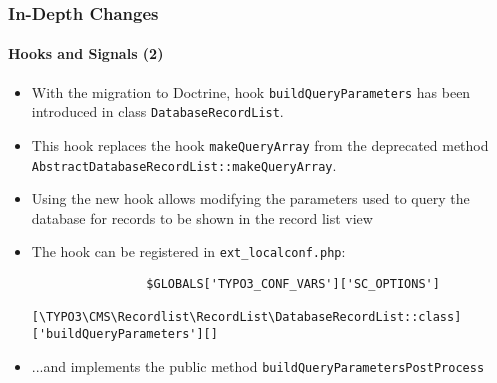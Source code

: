 \begin{frame}[fragile]
	\frametitle{In-Depth Changes}
	\framesubtitle{Hooks and Signals (2)}

	\lstset{basicstyle=\tiny\ttfamily}

	\begin{itemize}

		\item With the migration to Doctrine, hook \texttt{buildQueryParameters} has been introduced in class
			\texttt{DatabaseRecordList}.

		\item This hook replaces the hook \texttt{makeQueryArray} from the deprecated method
			\texttt{AbstractDatabaseRecordList::makeQueryArray}.

		\item Using the new hook allows modifying the parameters used to query the database for records
			to be shown in the record list view

		\item The hook can be registered in \texttt{ext\_localconf.php}:

			\begin{lstlisting}
				$GLOBALS['TYPO3_CONF_VARS']['SC_OPTIONS']
				  [\TYPO3\CMS\Recordlist\RecordList\DatabaseRecordList::class]['buildQueryParameters'][]
			\end{lstlisting}

		\item ...and implements the public method \texttt{buildQueryParametersPostProcess}

	\end{itemize}

\end{frame}

